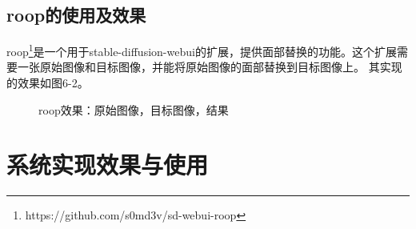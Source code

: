 \documentclass[a4paper,AutoFakeBold,oneside,12pt]{book}
\begin{document}
\section{roop的使用及效果}
roop\footnote{https://github.com/s0md3v/sd-webui-roop}是一个用于stable-diffusion-webui的扩展，提供面部替换的功能。这个扩展需要一张原始图像和目标图像，并能将原始图像的面部替换到目标图像上。
其实现的效果如图6-2。
\begin{figure}[!htbp]
    \centering
    \quad %
    \quad %
    \caption{roop效果：\protect{}原始图像，\protect{}目标图像，\protect{}结果} %
    \label{Fig:Roop} %
\end{figure}

\chapter{系统实现效果与使用} %
\end{document}
